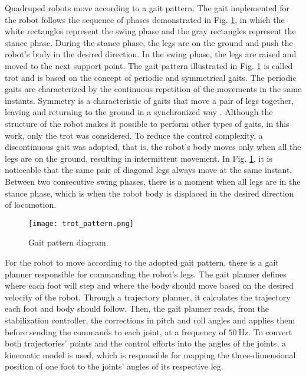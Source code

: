 \documentclass[conference]{IEEEtran}
\begin{document}
Quadruped robots move according to a gait pattern. The gait implemented for the robot follows the sequence of phases demonstrated in Fig. \ref{fig:trot_pattern}, in which the white rectangles represent the swing phase and the gray rectangles represent the stance phase. During the stance phase, the legs are on the ground and push the robot's body in the desired direction. In the swing phase, the legs are raised and moved to the next support point. The gait pattern illustrated in Fig. \ref{fig:trot_pattern} is called trot and is based on the concept of periodic and symmetrical gaits. The periodic gaits are characterized by the continuous repetition of the movements in the same instants. Symmetry is a characteristic of gaits that move a pair of legs together, leaving and returning to the ground in a synchronized way \cite{de2006quadrupedal}. Although the structure of the robot makes it possible to perform other types of gaits, in this work, only the trot was considered. To reduce the control complexity, a discontinuous gait was adopted, that is, the robot's body moves only when all the legs are on the ground, resulting in intermittent movement. In Fig. \ref{fig:trot_pattern}, it is noticeable that the same pair of diagonal legs always move at the same instant. Between two consecutive swing phases, there is a moment when all legs are in the stance phase, which is when the robot body is displaced in the desired direction of locomotion.

\begin{figure}[!b]
  \centering
  \texttt{[image: trot\_pattern.png]}
  \vfill
  \caption{Gait pattern diagram.}
  \label{fig:trot_pattern}
\end{figure}

For the robot to move according to the adopted gait pattern, there is a gait planner responsible for commanding the robot's legs. The gait planner defines where each foot will step and where the body should move based on the desired velocity of the robot. Through a trajectory planner, it calculates the trajectory each foot and body should follow. Then, the gait planner reads, from the stabilization controller, the corrections in pitch and roll angles and applies them before sending the commands to each joint, at a frequency of $\SI{50}{\hertz}$. To convert both trajectories' points and the control efforts into the angles of the joints, a kinematic model is used, which is responsible for mapping the three-dimensional position of one foot to the joints' angles of its respective leg.
\end{document}

